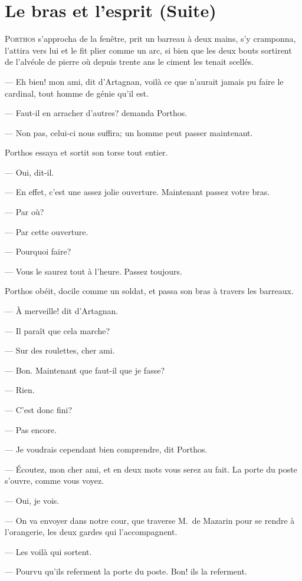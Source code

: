 \chapter{Le bras et l'esprit (Suite)}

\lettrine{P}{orthos} s'approcha de la fenêtre, prit un barreau à deux mains, s'y cramponna, l'attira vers lui et le fit plier comme un arc, si bien que les deux bouts sortirent de l'alvéole de pierre où depuis trente ans le ciment les tenait scellés.

\zz
— Eh bien! mon ami, dit d'Artagnan, voilà ce que n'aurait jamais pu faire le cardinal, tout homme de génie qu'il est.

— Faut-il en arracher d'autres? demanda Porthos.

— Non pas, celui-ci nous suffira; un homme peut passer maintenant.

Porthos essaya et sortit son torse tout entier.

— Oui, dit-il.

— En effet, c'est une assez jolie ouverture. Maintenant passez votre bras.

— Par où?

— Par cette ouverture.

— Pourquoi faire?

— Vous le saurez tout à l'heure. Passez toujours.

Porthos obéit, docile comme un soldat, et passa son bras à travers les barreaux.

— À merveille! dit d'Artagnan.

— Il paraît que cela marche?

— Sur des roulettes, cher ami.

— Bon. Maintenant que faut-il que je fasse?

— Rien.

— C'est donc fini?

— Pas encore.

— Je voudrais cependant bien comprendre, dit Porthos.

— Écoutez, mon cher ami, et en deux mots vous serez au fait. La porte du poste s'ouvre, comme vous voyez.

— Oui, je vois.

— On va envoyer dans notre cour, que traverse M.~de Mazarin pour se rendre à l'orangerie, les deux gardes qui l'accompagnent.

— Les voilà qui sortent.

— Pourvu qu'ils referment la porte du poste. Bon! ils la referment.

